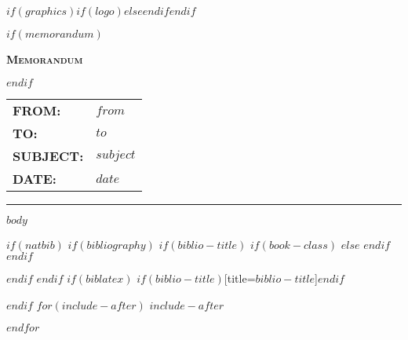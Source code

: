 \documentclass[$if(fontsize)$$fontsize$,$endif$$if(lang)$$babel-lang$,$endif$$if(papersize)$$papersize$,$endif$$for(classoption)$$classoption$$sep$,$endfor$]{article}
\begin{document}
\thispagestyle{plain}

$if(graphics)$$if(logo)$$else$$endif$$endif$




$if(memorandum)$
\begin{center}
\Large \bfseries{\scshape{Memorandum}}
\end{center}
$endif$

\setlength{\tabcolsep}{1em}
\renewcommand{\arraystretch}{1.5}
\begin{tabular}{@{}ll@{}}
\textbf{FROM:} & $from$ \\
\textbf{TO:} & $to$ \\
\textbf{SUBJECT:} & $subject$ \\
\textbf{DATE:} & $date$ \\
\end{tabular}

\vspace{.5 em}


\hrule



\vspace{6 mm}



$body$




$if(natbib)$
$if(bibliography)$
$if(biblio-title)$
$if(book-class)$
\renewcommand\bibname{$biblio-title$}
$else$
\renewcommand\refname{$biblio-title$}
$endif$
$endif$


$endif$
$endif$
$if(biblatex)$
\printbibliography$if(biblio-title)$[title=$biblio-title$]$endif$




$endif$
$for(include-after)$
$include-after$

$endfor$
\end{document}

